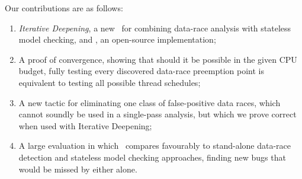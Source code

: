 Our contributions are as follows:
\begin{enumerate}
	\item {\em Iterative Deepening}, a new ~for combining data-race analysis with stateless model checking, and \quicksand, an open-source implementation;
	\item A proof of convergence, showing that should it be possible in the given CPU budget,
		fully testing every discovered data-race preemption point is equivalent to testing all possible thread schedules;
	\item A new tactic for eliminating one class of false-positive data races,
		which cannot soundly be used in a single-pass analysis,
		but which we prove correct when used with Iterative Deepening;
	\item A large evaluation in which \quicksand~compares favourably to stand-alone data-race detection and stateless model checking approaches, finding new bugs that would be missed by either alone.
\end{enumerate}

